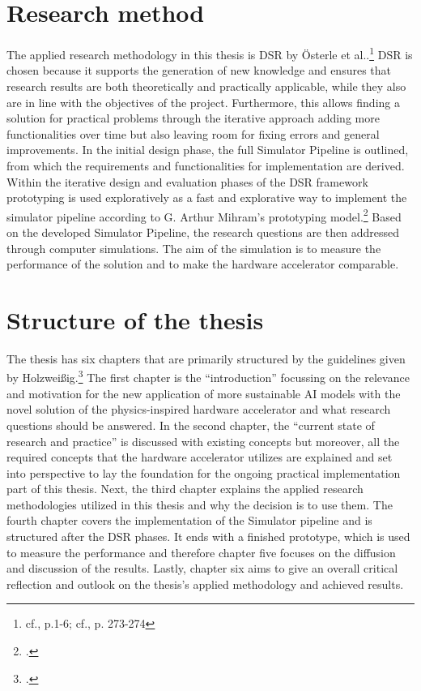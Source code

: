 \section{Research method}

The applied research methodology in this thesis is \ac{DSR} by Österle et al..\footnote{cf.\cite{oesterleMemorandumZurGestaltungsorientierten2010}, p.1-6; cf.\cite{oesterleKonsortialforschung2010}, p. 273-274}
\ac{DSR} is chosen because it supports the generation of new knowledge and ensures that research results are both theoretically and practically
applicable, while they also are in line with the objectives of the project.
Furthermore, this allows finding a solution for practical problems through the iterative approach adding more functionalities over time but also leaving room for fixing errors and general improvements.
In the initial design phase, the full Simulator Pipeline is outlined, from which the requirements and functionalities for implementation are derived.
Within the iterative design and evaluation phases of the \ac{DSR} framework prototyping is used exploratively as a fast and explorative way to implement the simulator pipeline according to G. Arthur Mihram's prototyping model.\footcite[cf.][71-72]{mihramSimulationMethodology1976}
Based on the developed Simulator Pipeline, the research questions are then addressed through computer simulations.
The aim of the simulation is to measure the performance of the solution and to make the hardware accelerator comparable. 

\section{Structure of the thesis}
The thesis has six chapters that are primarily structured by the guidelines given by Holzweißig.\footcite[cf.][32-40]{holzweissigWissenschaftlichesArbeiten2017}
The first chapter is the ``introduction'' focussing on the relevance and motivation for the new application of more sustainable AI models
with the novel solution of the physics-inspired hardware accelerator and what research questions should be answered.
In the second chapter, the ``current state of research and practice'' is discussed with 
existing concepts but moreover, all the required concepts that the hardware accelerator utilizes are explained 
and set into perspective to lay the foundation for the ongoing practical implementation part of this thesis.
Next, the third chapter explains the applied research methodologies utilized in this thesis and why the decision is to use them.
The fourth chapter covers the implementation of the Simulator pipeline and is structured after the \ac{DSR} phases.
It ends with a finished prototype, which is used to measure the performance and therefore chapter five focuses on the 
diffusion and discussion of the results. 
Lastly, chapter six aims to give an overall critical reflection and outlook on the thesis's applied methodology and achieved results.









